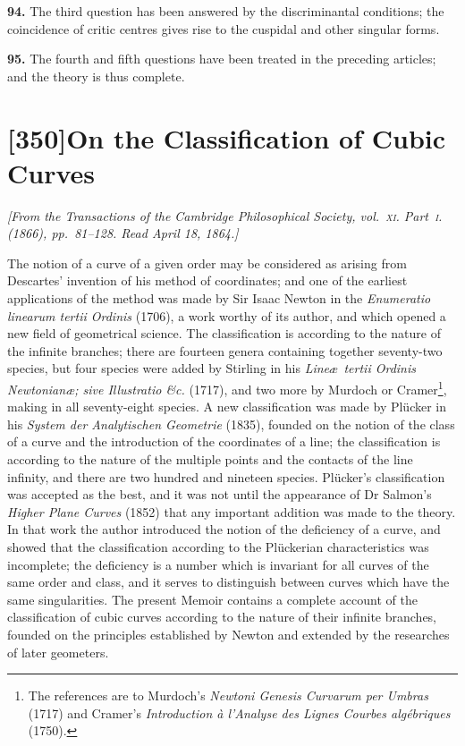 \documentclass[11pt,a4paper]{article}
\theoremstyle{plain}
\theoremstyle{definition}
\begin{document}
\textbf{94.} The third question has been answered by the discriminantal conditions; the coincidence of critic centres gives rise to the cuspidal and other singular forms.

\textbf{95.} The fourth and fifth questions have been treated in the preceding articles; and the theory is thus complete.

\newpage

\section*{[350]\quad On the Classification of Cubic Curves}

\noindent\textit{[From the \textit{Transactions of the Cambridge Philosophical Society}, vol.~\textsc{xi}. Part~\textsc{i}. (1866), pp.~81--128. Read April 18, 1864.]}

\bigskip

The notion of a curve of a given order may be considered as arising from Descartes' invention of his method of coordinates; and one of the earliest applications of the method was made by Sir Isaac Newton in the \textit{Enumeratio linearum tertii Ordinis} (1706), a work worthy of its author, and which opened a new field of geometrical science. The classification is according to the nature of the infinite branches; there are fourteen genera containing together seventy-two species, but four species were added by Stirling in his \textit{Line\ae\ tertii Ordinis Newtonian\ae; sive Illustratio \&c.} (1717), and two more by Murdoch or Cramer\footnote{The references are to Murdoch's \textit{Newtoni Genesis Curvarum per Umbras} (1717) and Cramer's \textit{Introduction \`a l'Analyse des Lignes Courbes alg\'ebriques} (1750).}, making in all seventy-eight species. A new classification was made by Pl\"{u}cker in his \textit{System der Analytischen Geometrie} (1835), founded on the notion of the class of a curve and the introduction of the coordinates of a line; the classification is according to the nature of the multiple points and the contacts of the line infinity, and there are two hundred and nineteen species. Pl\"{u}cker's classification was accepted as the best, and it was not until the appearance of Dr Salmon's \textit{Higher Plane Curves} (1852) that any important addition was made to the theory. In that work the author introduced the notion of the deficiency of a curve, and showed that the classification according to the Pl\"{u}ckerian characteristics was incomplete; the deficiency is a number which is invariant for all curves of the same order and class, and it serves to distinguish between curves which have the same singularities. The present Memoir contains a complete account of the classification of cubic curves according to the nature of their infinite branches, founded on the principles established by Newton and extended by the researches of later geometers.
\end{document}
